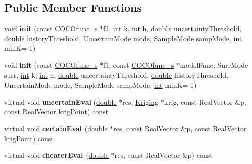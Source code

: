 \subsection*{Public Member Functions}
\begin{DoxyCompactItemize}
\item 
void {\bfseries init} (const \hyperlink{classCOCOfunc__s}{C\+O\+C\+Ofunc\+\_\+s} $\ast$f1, \hyperlink{classint}{int} k, \hyperlink{classint}{int} h, \hyperlink{classdouble}{double} uncertainty\+Threshold, \hyperlink{classdouble}{double} history\+Threshold, Uncertain\+Mode mode, Sample\+Mode samp\+Mode, \hyperlink{classint}{int} minK=-\/1)\hypertarget{classUncertainFunc__s_a21b46b2931861aaedb780c2224fe4c58}{}\label{classUncertainFunc__s_a21b46b2931861aaedb780c2224fe4c58}

\item 
void {\bfseries init} (const \hyperlink{classCOCOfunc__s}{C\+O\+C\+Ofunc\+\_\+s} $\ast$f1, const \hyperlink{classCOCOfunc__s}{C\+O\+C\+Ofunc\+\_\+s} $\ast$model\+Func, Surr\+Mode surr, \hyperlink{classint}{int} k, \hyperlink{classint}{int} h, \hyperlink{classdouble}{double} uncertainty\+Threshold, \hyperlink{classdouble}{double} history\+Threshold, Uncertain\+Mode mode, Sample\+Mode samp\+Mode, \hyperlink{classint}{int} minK=-\/1)\hypertarget{classUncertainFunc__s_a0952ff04469ee2b8d5cc7be8000ace00}{}\label{classUncertainFunc__s_a0952ff04469ee2b8d5cc7be8000ace00}

\item 
virtual void {\bfseries uncertain\+Eval} (\hyperlink{classdouble}{double} $\ast$res, \hyperlink{classKriging}{Kriging} $\ast$krig, const Real\+Vector \&p, const Real\+Vector krig\+Point) const \hypertarget{classUncertainFunc__s_a7197883529ae1c249a96f6392d44aaa0}{}\label{classUncertainFunc__s_a7197883529ae1c249a96f6392d44aaa0}

\item 
virtual void {\bfseries certain\+Eval} (\hyperlink{classdouble}{double} $\ast$res, const Real\+Vector \&p, const Real\+Vector krig\+Point) const \hypertarget{classUncertainFunc__s_a981dcd36f36ab4ecab180fac396b6bd7}{}\label{classUncertainFunc__s_a981dcd36f36ab4ecab180fac396b6bd7}

\item 
virtual void {\bfseries cheater\+Eval} (\hyperlink{classdouble}{double} $\ast$res, const Real\+Vector \&p) const \hypertarget{classUncertainFunc__s_a5ca5a80cac045d7c43d29480b664ca10}{}\label{classUncertainFunc__s_a5ca5a80cac045d7c43d29480b664ca10}


\end{DoxyCompactItemize}
